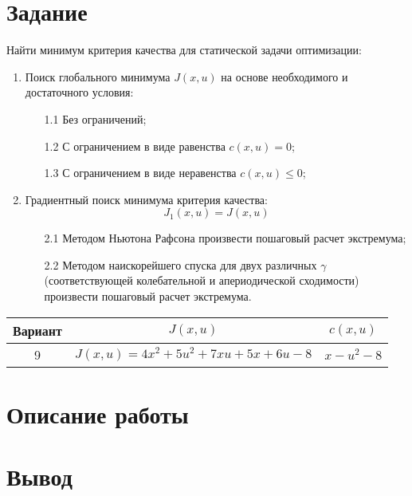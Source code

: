 \documentclass[14pt, a4paper]{extarticle}
\begin{document}
	\onehalfspacing
	
	\setcounter{page}{2}
	
	\section*{Задание}
	
	Найти минимум критерия качества для статической задачи оптимизации:
	\begin{enumerate}
		\item Поиск глобального минимума $J(x,u)$ на основе необходимого и достаточного условия:
		\begin{enumerate}
			\item[1.1] Без ограничений;
			\item[1.2] С ограничением в виде равенства $c(x,u)=0$;
			\item[1.3] С ограничением в виде неравенства $c(x,u)\le0$; 
		\end{enumerate}
		\item Градиентный поиск минимума критерия качества:
		$$J_1(x,u)=J(x,u)$$
		\begin{enumerate}
			\item[2.1] Методом Ньютона Рафсона произвести пошаговый расчет экстремума;
			\item[2.2] Методом наискорейшего спуска для двух различных $\gamma$ (соответствующей колебательной и апериодической сходимости) произвести пошаговый расчет экстремума. 
		\end{enumerate}
	\end{enumerate}
	\begin{table}[H]
		\centering
		\begin{tabular}{|c|c|c|}
			\hline
			Вариант & $J(x,u)$ & $c(x,u)$ \\\hline
			9 & $J(x,u)=4x^2+5u^2+7xu+5x+6u-8$ & $x-u^2-8$ \\\hline
		\end{tabular}
	\end{table}
	
	\newpage
	
	\section*{Описание работы}
	
	
	
	\newpage
	
	\section*{Вывод}
	

	
\end{document}
